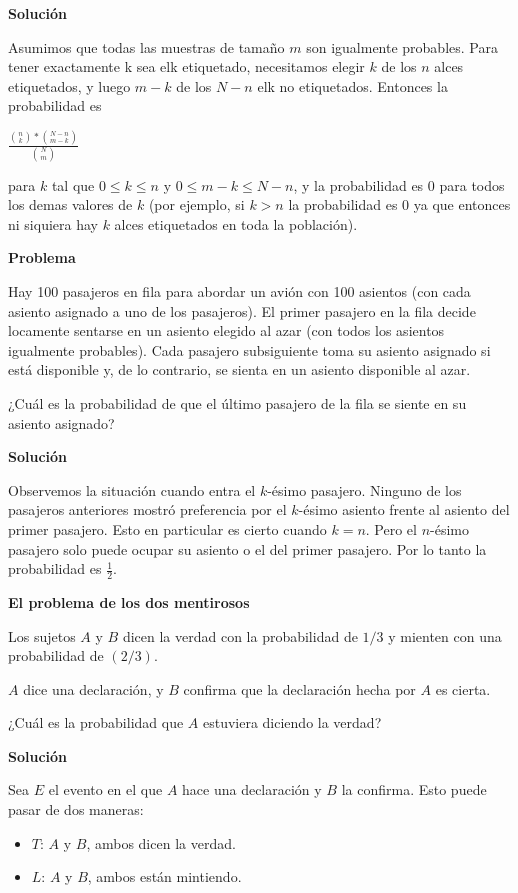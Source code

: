 \textbf{Solución}

Asumimos que todas las muestras de tamaño $m$ son igualmente probables. Para
tener exactamente k sea elk etiquetado, necesitamos elegir $k$ de los $n$ alces
etiquetados, y luego $m-k$ de los $N-n$ elk no etiquetados. Entonces la
probabilidad es

$\frac{\binom{n}{k}*\binom{N-n}{m-k}}{\binom{N}{m}}$

para $k$ tal que $0 \leq k \leq n$ y $0 \leq m-k \leq N-n$, y la probabilidad es
0 para todos los demas valores de $k$ (por ejemplo, si $k > n$ la
probabilidad es 0 ya que entonces ni siquiera hay $k$ alces etiquetados en toda
la población).

\textbf{Problema}

Hay 100 pasajeros en fila para abordar un avión con 100 asientos (con cada
asiento asignado a uno de los pasajeros). El primer pasajero en la fila decide
locamente sentarse en un asiento elegido al azar (con todos los asientos
igualmente probables). Cada pasajero subsiguiente toma su asiento asignado si
está disponible y, de lo contrario, se sienta en un asiento disponible al azar.

¿Cuál es la probabilidad de que el último pasajero de la fila se siente en su
asiento asignado?

\textbf{Solución}

Observemos la situación cuando entra el $k$-ésimo pasajero. Ninguno de los
pasajeros anteriores mostró preferencia por el $k$-ésimo asiento frente al
asiento del primer pasajero. Esto en particular es cierto cuando $k=n$. Pero el
$n$-ésimo pasajero solo puede ocupar su asiento o el del primer pasajero. Por lo
tanto la probabilidad es $\frac{1}{2}$.

\textbf{El problema de los dos mentirosos}

Los sujetos $A$ y $B$ dicen la verdad con la probabilidad de $1/3$ y mienten con
una probabilidad de $(2/3)$.

$A$ dice una declaración, y $B$ confirma que la declaración hecha por $A$ es
cierta.

¿Cuál es la probabilidad que $A$ estuviera diciendo la verdad?

\textbf{Solución}

Sea $E$ el evento en el que $A$ hace una declaración y $B$ la confirma. Esto
puede pasar de dos maneras:

\begin{itemize}
    \item $T$: $A$ y $B$, ambos dicen la verdad.
    \item $L$: $A$ y $B$, ambos están mintiendo.
\end{itemize}

